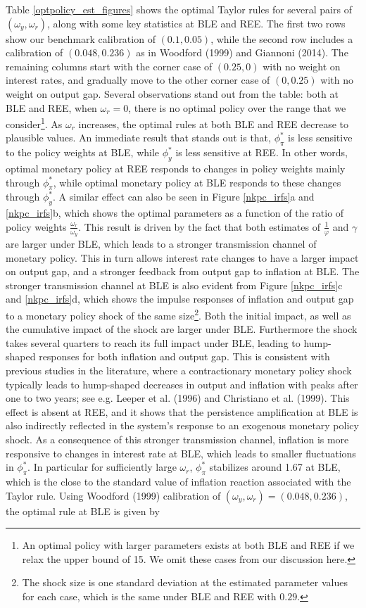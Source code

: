 Table \ref{optpolicy_est_figures} shows the optimal Taylor rules for several pairs of $(\omega_y,\omega_r)$, along with some key statistics at BLE and REE. The first two rows show our benchmark calibration of $(0.1,0.05)$, while the second row includes a calibration of $(0.048,0.236)$ as in Woodford (1999) and Giannoni (2014). The remaining columns start with the corner case of $(0.25,0)$ with no weight on interest rates, and gradually move to the other corner case of $(0,0.25)$ with no weight on output gap. Several observations stand out from the table: both at BLE and REE, when $\omega_r=0$, there is no optimal policy over the range that we consider\footnote{An optimal policy with larger parameters exists at both BLE and REE if we relax the upper bound of 15. We omit these cases from our discussion here.}. As $\omega_r$ increases, the optimal rules at both BLE and REE decrease to plausible values. An immediate result that stands out is that, $\phi_{\pi}^{*}$ is less sensitive to the policy weights at BLE, while $\phi_y^{*}$ is less sensitive at REE. In other words, optimal monetary policy at REE responds to changes in policy weights mainly through $\phi_{\pi}^{*}$, while optimal monetary policy at BLE responds to these changes through $\phi_y^{*}$. A similar effect can also be seen in Figure \ref{nkpc_irfs}a and \ref{nkpc_irfs}b, which shows the optimal parameters as a function of the ratio of policy weights $\frac{\omega_r}{\omega_y}$. This result is driven by the fact that both estimates of  $\frac{1}{\varphi}$ and $\gamma$ are larger under BLE, which leads to a stronger transmission channel of monetary policy. This in turn allows interest rate changes to have a larger impact on output gap, and a stronger feedback from output gap to inflation at BLE. The stronger transmission channel at BLE is also evident from Figure \ref{nkpc_irfs}c and \ref{nkpc_irfs}d, which shows the impulse responses of inflation and output gap to a monetary policy shock of the same size\footnote{The shock size is one standard deviation at the estimated parameter values for each case, which is the same under BLE and REE with $0.29$.}. Both the initial impact, as well as the cumulative impact of the shock are larger under BLE. Furthermore the shock takes several quarters to reach its full impact under BLE, leading to hump-shaped responses for both inflation and output gap. This is consistent with previous studies in the literature, where a contractionary monetary policy shock typically leads to hump-shaped decreases in output and inflation with peaks after one to two years; see e.g. Leeper et al. (1996) and Christiano et al. (1999). This effect is absent at REE, and it shows that the persistence amplification at BLE is also indirectly reflected in the system's response to an exogenous monetary policy shock. As a consequence of this stronger transmission channel, inflation is more responsive to changes in interest rate at BLE, which leads to smaller fluctuations in $\phi_{\pi}^{*}$. In particular for sufficiently large $\omega_r$, $\phi_{\pi}^{*}$ stabilizes around 1.67 at BLE, which is the close to the standard value of inflation reaction associated with the Taylor rule. Using Woodford (1999) calibration of $(\omega_y,\omega_r)=(0.048,0.236)$, the optimal rule at BLE is given by 